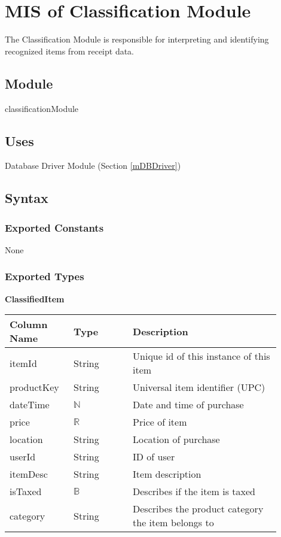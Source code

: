 \documentclass[12pt, titlepage]{article}
\begin{document}
\newpage

\section{MIS of Classification Module} \label{mClassification}

The Classification Module is responsible for interpreting and identifying recognized items from receipt data.

\subsection{Module}

classificationModule

\subsection{Uses}

Database Driver Module (Section \ref{mDBDriver})

\subsection{Syntax}

\subsubsection{Exported Constants}

None

\subsubsection{Exported Types}

\textbf{ClassifiedItem}

\begin{table}[H]
  \begin{tabular}{|p{0.2\linewidth}|p{0.2\linewidth}|p{0.5\linewidth}|}
    \hline
    \textbf{Column Name} & \textbf{Type} & \textbf{Description} \\
    \hline
    itemId & String & Unique id of this instance of this item \\
    \hline
    productKey & String & Universal item identifier (UPC) \\
    \hline
    dateTime & $\mathbb{N}$ & Date and time of purchase \\
    \hline
    price & $\mathbb{R}$ & Price of item \\
    \hline
    location & String & Location of purchase \\
    \hline
    userId & String & ID of user\\
    \hline
    itemDesc & String & Item description\\
    \hline
    isTaxed & $\mathbb{B}$ & Describes if the item is taxed\\
    \hline
    category & String & Describes the product category the item belongs to\\
    \hline
  \end{tabular}
\end{table}
\end{document}
